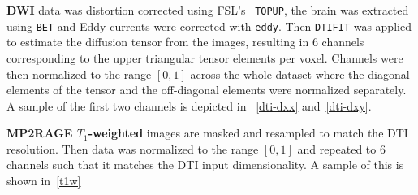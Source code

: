 \textbf{DWI} data was distortion corrected using FSL's~\autocite{smith_advances_2004} \texttt{TOPUP}, the brain was extracted using \texttt{BET} and Eddy currents were corrected with \texttt{eddy}.
Then \texttt{DTIFIT} was applied to estimate the diffusion tensor from the images, resulting in 6 channels corresponding to the upper triangular tensor elements per voxel.
Channels were then normalized to the range $[0, 1]$ across the whole dataset where the diagonal elements of the tensor and the off-diagonal elements were normalized separately.
A sample of the first two channels is depicted in ~\ref{dti-dxx} and~\ref{dti-dxy}.

\textbf{MP2RAGE $T_1$-weighted} images are masked and resampled to match the DTI resolution.
Then data was normalized to the range $[0, 1]$ and repeated to 6 channels such that it matches the DTI input dimensionality.
A sample of this is shown in~\ref{t1w}

